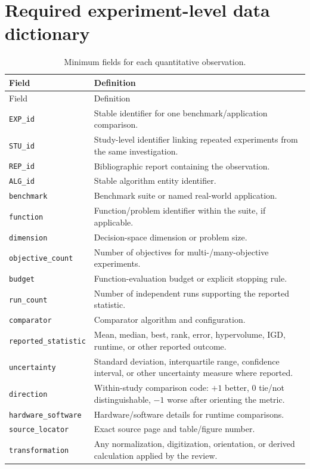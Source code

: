 \documentclass[10pt]{article}
\begin{document}
\section*{Required experiment-level data dictionary}
\begin{longtable}{P{4.0cm}P{10.2cm}}
\caption{Minimum fields for each quantitative observation.}\\
\toprule
Field & Definition\\
\midrule\endfirsthead
\toprule Field & Definition\\\midrule\endhead
\texttt{EXP\_id} & Stable identifier for one benchmark/application comparison.\\
\texttt{STU\_id} & Study-level identifier linking repeated experiments from the same investigation.\\
\texttt{REP\_id} & Bibliographic report containing the observation.\\
\texttt{ALG\_id} & Stable algorithm entity identifier.\\
\texttt{benchmark} & Benchmark suite or named real-world application.\\
\texttt{function} & Function/problem identifier within the suite, if applicable.\\
\texttt{dimension} & Decision-space dimension or problem size.\\
\texttt{objective\_count} & Number of objectives for multi-/many-objective experiments.\\
\texttt{budget} & Function-evaluation budget or explicit stopping rule.\\
\texttt{run\_count} & Number of independent runs supporting the reported statistic.\\
\texttt{comparator} & Comparator algorithm and configuration.\\
\texttt{reported\_statistic} & Mean, median, best, rank, error, hypervolume, IGD, runtime, or other reported outcome.\\
\texttt{uncertainty} & Standard deviation, interquartile range, confidence interval, or other uncertainty measure where reported.\\
\texttt{direction} & Within-study comparison code: $+1$ better, $0$ tie/not distinguishable, $-1$ worse after orienting the metric.\\
\texttt{hardware\_software} & Hardware/software details for runtime comparisons.\\
\texttt{source\_locator} & Exact source page and table/figure number.\\
\texttt{transformation} & Any normalization, digitization, orientation, or derived calculation applied by the review.\\
\bottomrule\end{longtable}
\end{document}
